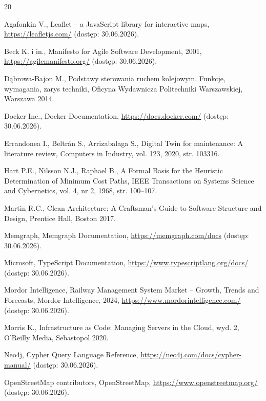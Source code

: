 \documentclass[twoside]{projektInzynierskiMS1z}
\begin{document}
\begin{thebibliography}{20}

 Agafonkin V., Leaflet -- a JavaScript library for interactive maps, \url{https://leafletjs.com/} (dostęp: 30.06.2026).

 Beck K. i in., Manifesto for Agile Software Development, 2001, \url{https://agilemanifesto.org/} (dostęp: 30.06.2026).

 Dąbrowa-Bajon M., Podstawy sterowania ruchem kolejowym. Funkcje, wymagania, zarys techniki, Oficyna Wydawnicza Politechniki Warszawskiej, Warszawa 2014.

 Docker Inc., Docker Documentation, \url{https://docs.docker.com/} (dostęp: 30.06.2026).

 Errandonea I., Beltrán S., Arrizabalaga S., Digital Twin for maintenance: A literature review, Computers in Industry, vol. 123, 2020, str. 103316.

 Hart P.E., Nilsson N.J., Raphael B., A Formal Basis for the Heuristic Determination of Minimum Cost Paths, IEEE Transactions on Systems Science and Cybernetics, vol. 4, nr 2, 1968, str. 100--107.

 Martin R.C., Clean Architecture: A Craftsman's Guide to Software Structure and Design, Prentice Hall, Boston 2017.

 Memgraph, Memgraph Documentation, \url{https://memgraph.com/docs} (dostęp: 30.06.2026).

 Microsoft, TypeScript Documentation, \url{https://www.typescriptlang.org/docs/} (dostęp: 30.06.2026).

 Mordor Intelligence, Railway Management System Market -- Growth, Trends and Forecasts, Mordor Intelligence, 2024, \url{https://www.mordorintelligence.com/} (dostęp: 30.06.2026).

 Morris K., Infrastructure as Code: Managing Servers in the Cloud, wyd. 2, O'Reilly Media, Sebastopol 2020.

 Neo4j, Cypher Query Language Reference, \url{https://neo4j.com/docs/cypher-manual/} (dostęp: 30.06.2026).

 OpenStreetMap contributors, OpenStreetMap, \url{https://www.openstreetmap.org/} (dostęp: 30.06.2026).


\end{thebibliography}
\end{document}
